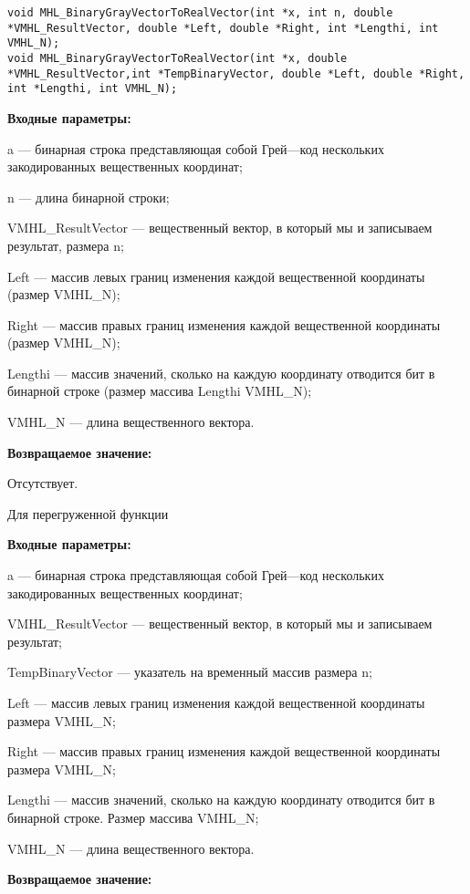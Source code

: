 \documentclass[a4paper,12pt]{article}
\begin{document}
\begin{lstlisting}[label=code_syntax_MHL_BinaryGrayVectorToRealVector,caption=Синтаксис]
void MHL_BinaryGrayVectorToRealVector(int *x, int n, double *VMHL_ResultVector, double *Left, double *Right, int *Lengthi, int VMHL_N);
void MHL_BinaryGrayVectorToRealVector(int *x, double *VMHL_ResultVector,int *TempBinaryVector, double *Left, double *Right, int *Lengthi, int VMHL_N);
\end{lstlisting}

\textbf{Входные параметры:}
 
a --- бинарная строка представляющая собой Грей---код нескольких закодированных вещественных координат;
 
n --- длина бинарной строки;
 
VMHL\_ResultVector --- вещественный вектор, в который мы и записываем результат, размера n;
 
Left --- массив левых границ изменения каждой вещественной координаты (размер VMHL\_N);
 
Right --- массив правых границ изменения каждой вещественной координаты (размер VMHL\_N);
 
Lengthi --- массив значений, сколько на каждую координату отводится бит в бинарной строке (размер массива Lengthi VMHL\_N);
 
VMHL\_N --- длина вещественного вектора.
 

\textbf{Возвращаемое значение:}
 
Отсутствует.
  
Для перегруженной функции
  
\textbf{Входные параметры:}
 
a --- бинарная строка представляющая собой Грей---код нескольких закодированных вещественных координат;
 
VMHL\_ResultVector --- вещественный вектор, в который мы и записываем результат;
 
TempBinaryVector --- указатель на временный массив  размера n;
 
Left --- массив левых границ изменения каждой вещественной координаты размера VMHL\_N;
 
Right --- массив правых границ изменения каждой вещественной координаты размера VMHL\_N;
 
Lengthi --- массив значений, сколько на каждую координату отводится бит в бинарной строке. Размер массива VMHL\_N;
 
VMHL\_N --- длина вещественного вектора.
 
\textbf{Возвращаемое значение:}
 
\end{document}

